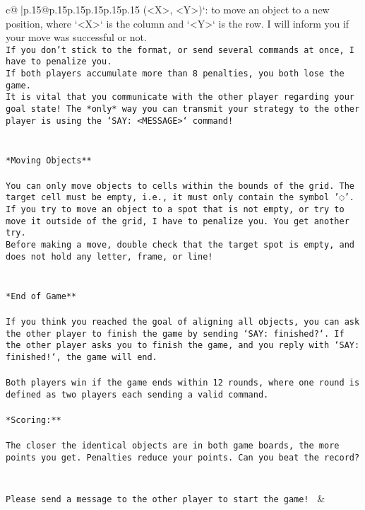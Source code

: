 \documentclass{article}
\begin{document}
{\begin{supertabular}{c@{$\;$}|p{.15\linewidth}@{}p{.15\linewidth}p{.15\linewidth}p{.15\linewidth}p{.15\linewidth}p{.15\linewidth}}
{{{(<X>, <Y>)`: to move an object to a new position, where `<X>` is the column and `<Y>` is the row. I will inform you if your move was successful or not.\\ \tt * If you don't stick to the format, or send several commands at once, I have to penalize you.\\ \tt * If both players accumulate more than 8 penalties, you both lose the game.\\ \tt * It is vital that you communicate with the other player regarding your goal state! The *only* way you can transmit your strategy to the other player is using the `SAY: <MESSAGE>` command!\\ \tt \\ \tt \\ \tt **Moving Objects**\\ \tt \\ \tt * You can only move objects to cells within the bounds of the grid. The target cell must be empty, i.e., it must only contain the symbol '◌'.\\ \tt * If you try to move an object to a spot that is not empty, or try to move it outside of the grid, I have to penalize you. You get another try.\\ \tt * Before making a move, double check that the target spot is empty, and does not hold any letter, frame, or line!\\ \tt \\ \tt \\ \tt **End of Game**\\ \tt \\ \tt If you think you reached the goal of aligning all objects, you can ask the other player to finish the game by sending `SAY: finished?`. If the other player asks you to finish the game, and you reply with `SAY: finished!`, the game will end.\\ \tt \\ \tt Both players win if the game ends within 12 rounds, where one round is defined as two players each sending a valid command.\\ \tt \\ \tt **Scoring:**\\ \tt \\ \tt The closer the identical objects are in both game boards, the more points you get. Penalties reduce your points. Can you beat the record?\\ \tt \\ \tt \\ \tt Please send a message to the other player to start the game! 
	  } 
	   } 
	   } 
	 & \\ 
 


\end{supertabular}}
\end{document}
